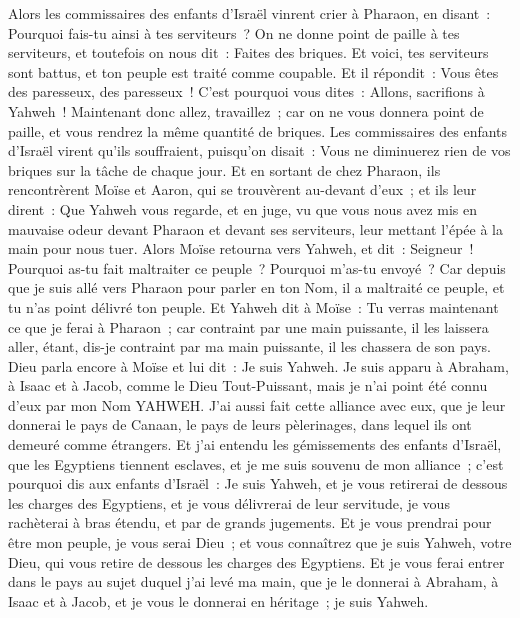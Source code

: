 \begin{multicols}{2}
Alors les commissaires des enfants d'Israël vinrent crier à Pharaon, en disant~: Pourquoi fais-tu ainsi à tes serviteurs~?
On ne donne point de paille à tes serviteurs, et toutefois on nous dit~: Faites des briques. Et voici, tes serviteurs sont battus, et ton peuple est traité comme coupable.
Et il répondit~: Vous êtes des paresseux, des paresseux~! C'est pourquoi vous dites~: Allons, sacrifions à Yahweh~!
Maintenant donc allez, travaillez~; car on ne vous donnera point de paille, et vous rendrez la même quantité de briques.
Les commissaires des enfants d'Israël virent qu'ils souffraient, puisqu'on disait~: Vous ne diminuerez rien de vos briques sur la tâche de chaque jour.
Et en sortant de chez Pharaon, ils rencontrèrent Moïse et Aaron, qui se trouvèrent au-devant d'eux~;
et ils leur dirent~: Que Yahweh vous regarde, et en juge, vu que vous nous avez mis en mauvaise odeur devant Pharaon et devant ses serviteurs, leur mettant l'épée à la main pour nous tuer.
Alors Moïse retourna vers Yahweh, et dit~: Seigneur~! Pourquoi as-tu fait maltraiter ce peuple~? Pourquoi m'as-tu envoyé~?
Car depuis que je suis allé vers Pharaon pour parler en ton Nom, il a maltraité ce peuple, et tu n'as point délivré ton peuple.
\VerseOne{}Et Yahweh dit à Moïse~: Tu verras maintenant ce que je ferai à Pharaon~; car contraint par une main puissante, il les laissera aller, étant, dis-je contraint par ma main puissante, il les chassera de son pays.
Dieu parla encore à Moïse et lui dit~: Je suis Yahweh.
Je suis apparu à Abraham, à Isaac et à Jacob, comme le Dieu Tout-Puissant, mais je n'ai point été connu d'eux par mon Nom YAHWEH.
J'ai aussi fait cette alliance avec eux, que je leur donnerai le pays de Canaan, le pays de leurs pèlerinages, dans lequel ils ont demeuré comme étrangers.
Et j'ai entendu les gémissements des enfants d'Israël, que les Egyptiens tiennent esclaves, et je me suis souvenu de mon alliance~;
c'est pourquoi dis aux enfants d'Israël~: Je suis Yahweh, et je vous retirerai de dessous les charges des Egyptiens, et je vous délivrerai de leur servitude, je vous rachèterai à bras étendu, et par de grands jugements.
Et je vous prendrai pour être mon peuple, je vous serai Dieu~; et vous connaîtrez que je suis Yahweh, votre Dieu, qui vous retire de dessous les charges des Egyptiens.
Et je vous ferai entrer dans le pays au sujet duquel j'ai levé ma main, que je le donnerai à Abraham, à Isaac et à Jacob, et je vous le donnerai en héritage~; je suis Yahweh.

\end{multicols}
